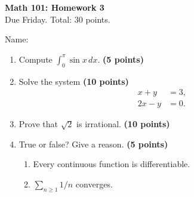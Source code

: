 \documentclass{article}
\newcommand{\points}[1]{\hfill\textbf{(#1 points)}}
\begin{document}
\begin{center}
  {\Large\textbf{Math 101: Homework 3}}\\
  Due Friday. Total: 30 points.
\end{center}

\noindent Name: \underline{\hspace{6cm}}

\begin{enumerate}
  \item Compute $\displaystyle \int_0^{\pi} \sin x \, dx$. \points{5}
  \item Solve the system \points{10}
    \[ \begin{aligned} x + y &= 3, \\ 2x - y &= 0. \end{aligned} \]
  \item Prove that $\sqrt{2}$ is irrational. \points{10}
  \item True or false? Give a reason. \points{5}
    \begin{enumerate}
      \item Every continuous function is differentiable.
      \item $\sum_{n \ge 1} 1/n$ converges.
    \end{enumerate}
\end{enumerate}
\end{document}
